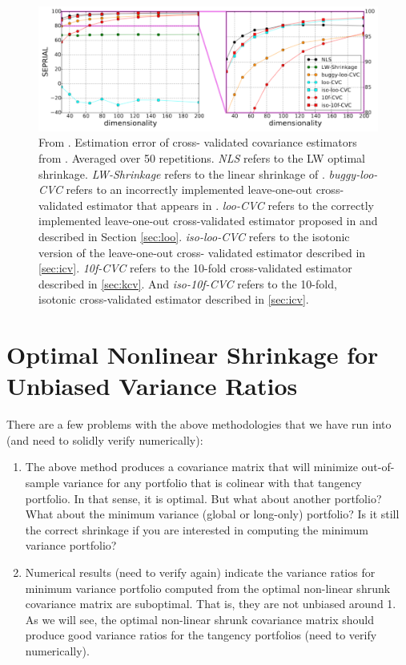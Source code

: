 \documentclass{article}
\begin{document}
	\begin{figure}[htbp]
		\centering
		\includegraphics[width=6in]{cv.png}
		\caption{
			From \cite{Bartz2016CrossValidation}.  Estimation error of cross-
			validated covariance estimators from \cite{Bartz2016CrossValidation}.
			Averaged over 50 repetitions.  \emph{NLS} refers to the LW optimal
			shrinkage. \emph{LW-Shrinkage} refers to the linear shrinkage of
			\cite{Ledoit2004WellConditioned}. \emph{buggy-loo-CVC} refers to an
			incorrectly implemented leave-one-out cross-validated estimator that
			appears in \cite{Ledoit2012Nonlinear}. \emph{loo-CVC} refers to the
			correctly implemented leave-one-out cross-validated estimator proposed in
			\cite{Ledoit2012Nonlinear} and described in Section \ref{sec:loo}. \emph
			{iso-loo-CVC} refers to the isotonic version of the leave-one-out cross-
			validated estimator described in \ref{sec:icv}.  \emph {10f-CVC} refers to
			the 10-fold cross-validated estimator described in \ref{sec:kcv}.  And
			\emph{iso-10f-CVC} refers to the 10-fold, isotonic cross-validated
			estimator described in \ref{sec:icv}. }
		\label{fig:cv}
	\end{figure}


\section{Optimal Nonlinear Shrinkage for Unbiased Variance Ratios}


There are a few problems with the above methodologies that we have run into (and
need to solidly verify numerically):
\begin{enumerate}
	\item The above method produces a covariance matrix that will minimize out-of-
	sample variance for any portfolio that is colinear with that tangency
	portfolio.  In that sense, it is optimal.  But what about another portfolio?
	What about the minimum variance (global or long-only) portfolio?  Is it still
	the correct shrinkage if you are interested in computing the minimum variance
	portfolio?

	\item Numerical results (need to verify again) indicate the variance ratios
	for minimum variance portfolio computed from the optimal non-linear shrunk
	covariance matrix are suboptimal.  That is, they are not unbiased around 1.  
  As we will see, the optimal non-linear shrunk covariance matrix should produce
  good variance ratios for the tangency portfolios (need to verify numerically).


\end{enumerate}
\end{document}
